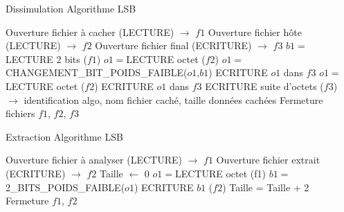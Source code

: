 \documentclass[11pt]{article}
\begin{document}
\begin{minipage}{.5\textwidth}
\begin{algorithm}[H]
\caption{Dissimulation Algorithme LSB}
\begin{algorithmic}
\STATE \footnotesize Ouverture fichier à cacher (LECTURE) $\rightarrow$ $f1$
\STATE Ouverture fichier hôte (LECTURE) $\rightarrow$ $f2$
\STATE Ouverture fichier final (ECRITURE) $\rightarrow$ $f3$
\STATE $b1 = $LECTURE 2 bits ($f1$)
\STATE $o1 = $LECTURE octet ($f2$)
\STATE $o1 = $CHANGEMENT\_BIT\_POIDS\_FAIBLE($o1$,$b1$)
\STATE ECRITURE $o1$ dans $f3$
\ENDWHILE
{}
\STATE $o1 =$LECTURE octet ($f2$)
\STATE ECRITURE $o1$ dans $f3$
\ENDWHILE
\STATE ECRITURE suite d'octets ($f3$) $\rightarrow$ identification algo, nom fichier caché, taille données cachées
\STATE Fermeture fichiers $f1$, $f2$, $f3$
\end{algorithmic}
\end{algorithm}
\normalsize
\end{minipage}
\begin{minipage}{.5\textwidth}
\begin{algorithm}[H]
\caption{Extraction Algorithme LSB}
\begin{algorithmic}
\STATE \footnotesize Ouverture fichier à analyser (LECTURE) $\rightarrow$ $f1$
\STATE Ouverture fichier extrait (ECRITURE) $\rightarrow$ $f2$
\STATE Taille $\leftarrow$ 0
\STATE $o1 = $LECTURE octet (f1)
\STATE $b1 = $2\_BITS\_POIDS\_FAIBLE($o1$)
\STATE ECRITURE $b1$ ($f2$)
\STATE Taille = Taille + 2
\ENDWHILE
\STATE Fermeture $f1$, $f2$
\end{algorithmic}
\end{algorithm}
\normalsize
\end{minipage}




\end{document}
